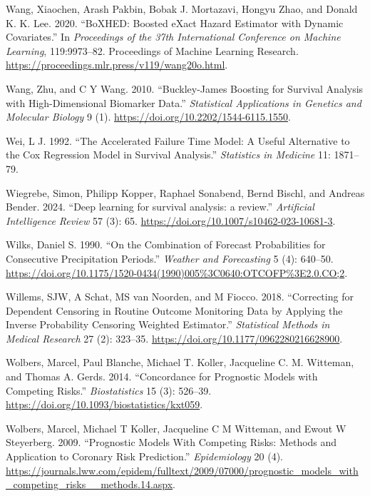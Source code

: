 \documentclass[
  letterpaper,
  krantz2]{style/krantz}
\newlength{\cslhangindent}
\newenvironment{CSLReferences}[2] %
 {\begin{list}{}{%
  \setlength{\itemindent}{0pt}
  \setlength{\leftmargin}{0pt}
  \setlength{\parsep}{0pt}
  \ifodd #1
   \setlength{\leftmargin}{\cslhangindent}
   \setlength{\itemindent}{-1\cslhangindent}
  \fi
  \setlength{\itemsep}{#2\baselineskip}}}
 {\end{list}}
\begin{document}
\begin{CSLReferences}{1}{0}
Wang, Xiaochen, Arash Pakbin, Bobak J. Mortazavi, Hongyu Zhao, and
Donald K. K. Lee. 2020. {``{BoXHED: Boosted eXact Hazard Estimator with
Dynamic Covariates}.''} In \emph{Proceedings of the 37th International
Conference on Machine Learning}, 119:9973--82. Proceedings of Machine
Learning Research.
\url{https://proceedings.mlr.press/v119/wang20o.html}.

Wang, Zhu, and C Y Wang. 2010. {``{Buckley-James Boosting for Survival
Analysis with High-Dimensional Biomarker Data}.''} \emph{Statistical
Applications in Genetics and Molecular Biology} 9 (1).
\url{https://doi.org/10.2202/1544-6115.1550}.

Wei, L J. 1992. {``{The Accelerated Failure Time Model: A Useful
Alternative to the Cox Regression Model in Survival Analysis}.''}
\emph{Statistics in Medicine} 11: 1871--79.

Wiegrebe, Simon, Philipp Kopper, Raphael Sonabend, Bernd Bischl, and
Andreas Bender. 2024. {``{Deep learning for survival analysis: a
review}.''} \emph{Artificial Intelligence Review} 57 (3): 65.
\url{https://doi.org/10.1007/s10462-023-10681-3}.

Wilks, Daniel S. 1990. {``On the Combination of Forecast Probabilities
for Consecutive Precipitation Periods.''} \emph{Weather and Forecasting}
5 (4): 640--50.
\url{https://doi.org/10.1175/1520-0434(1990)005\%3C0640:OTCOFP\%3E2.0.CO;2}.

Willems, SJW, A Schat, MS van Noorden, and M Fiocco. 2018. {``Correcting
for Dependent Censoring in Routine Outcome Monitoring Data by Applying
the Inverse Probability Censoring Weighted Estimator.''}
\emph{Statistical Methods in Medical Research} 27 (2): 323--35.
\url{https://doi.org/10.1177/0962280216628900}.

Wolbers, Marcel, Paul Blanche, Michael T. Koller, Jacqueline C. M.
Witteman, and Thomas A. Gerds. 2014. {``Concordance for Prognostic
Models with Competing Risks.''} \emph{Biostatistics} 15 (3): 526--39.
\url{https://doi.org/10.1093/biostatistics/kxt059}.

Wolbers, Marcel, Michael T Koller, Jacqueline C M Witteman, and Ewout W
Steyerberg. 2009. {``{Prognostic Models With Competing Risks: Methods
and Application to Coronary Risk Prediction}.''} \emph{Epidemiology} 20
(4).
\url{https://journals.lww.com/epidem/fulltext/2009/07000/prognostic_models_with_competing_risks__methods.14.aspx}.


\end{CSLReferences}
\end{document}
